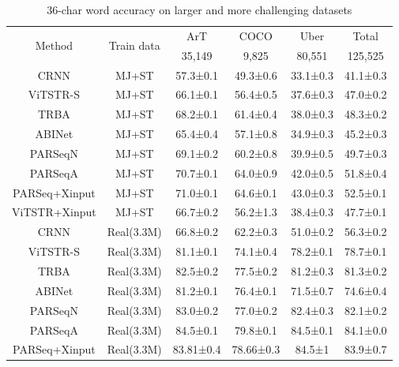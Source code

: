 \documentclass[runningheads]{llncs}
\begin{document}
\begin{table}[htbp]
\centering

  \begin{tabular}{cccccc}
  \hline
  \multirow{2}{*}{Method} & \multirow{2}{*}{Train data} & ArT       & COCO      & Uber     & Total    \\
                          &                             & 35,149    & 9,825     & 80,551   & 125,525  \\ \hline
  CRNN                    & MJ+ST                       & 57.3±0.1  & 49.3±0.6  & 33.1±0.3 & 41.1±0.3 \\
  ViTSTR-S                & MJ+ST                       & 66.1±0.1  & 56.4±0.5  & 37.6±0.3 & 47.0±0.2 \\
  TRBA                    & MJ+ST                       & 68.2±0.1  & 61.4±0.4  & 38.0±0.3 & 48.3±0.2 \\
  ABINet                  & MJ+ST                       & 65.4±0.4  & 57.1±0.8  & 34.9±0.3 & 45.2±0.3 \\
  PARSeqN                 & MJ+ST                       & 69.1±0.2  & 60.2±0.8  & 39.9±0.5 & 49.7±0.3 \\
  PARSeqA                 & MJ+ST                       & 70.7±0.1  & 64.0±0.9  & 42.0±0.5 & 51.8±0.4 \\ \hline
  PARSeq+Xinput           & MJ+ST                       & 71.0±0.1  & 64.6±0.1  & 43.0±0.3 & 52.5±0.1 \\
  ViTSTR+Xinput           & MJ+ST                       & 66.7±0.2  & 56.2±1.3  & 38.4±0.3 & 47.7±0.1 \\ \hline
  CRNN                    & Real(3.3M)                  & 66.8±0.2  & 62.2±0.3  & 51.0±0.2 & 56.3±0.2 \\
  ViTSTR-S                & Real(3.3M)                  & 81.1±0.1  & 74.1±0.4  & 78.2±0.1 & 78.7±0.1 \\
  TRBA                    & Real(3.3M)                  & 82.5±0.2  & 77.5±0.2  & 81.2±0.3 & 81.3±0.2 \\
  ABINet                  & Real(3.3M)                  & 81.2±0.1  & 76.4±0.1  & 71.5±0.7 & 74.6±0.4 \\
  PARSeqN                 & Real(3.3M)                  & 83.0±0.2  & 77.0±0.2  & 82.4±0.3 & 82.1±0.2 \\
  PARSeqA                 & Real(3.3M)                  & 84.5±0.1  & 79.8±0.1  & 84.5±0.1 & 84.1±0.0 \\ \hline
  PARSeq+Xinput           & Real(3.3M)                  & 83.81±0.4 & 78.66±0.3 & 84.5±1   & 83.9±0.7 \\ \hline
  \end{tabular}
  \caption[short]{36-char word accuracy on larger and more challenging datasets}\label{table:hard}
\end{table}
\end{document}
